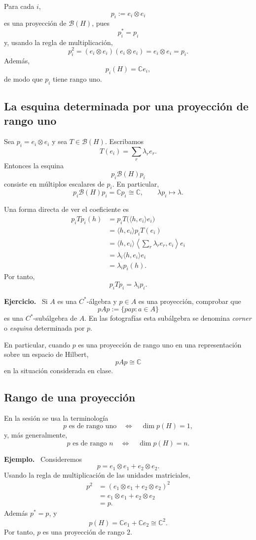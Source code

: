 \documentclass[11pt]{article}
\newcommand{\C}{\mathbb{C}}
\newcommand{\BH}{\mathcal{B}(H)}
\newenvironment{ejemplo}{\par\medskip\noindent\textbf{Ejemplo.}\ }{\par\medskip}
\newenvironment{ejercicio}{\par\medskip\noindent\textbf{Ejercicio.}\ }{\par\medskip}
\begin{document}
Para cada $i$,
\[
p_i:=e_i\otimes e_i
\]
es una proyección de $\BH$, pues
\[
p_i^*=p_i
\]
y, usando la regla de multiplicación,
\[
p_i^2=(e_i\otimes e_i)(e_i\otimes e_i)=e_i\otimes e_i=p_i.
\]
Además,
\[
p_i(H)=\C e_i,
\]
de modo que $p_i$ tiene rango uno.

\subsection{La esquina determinada por una proyección de rango uno}

Sea $p_i=e_i\otimes e_i$ y sea $T\in\BH$. Escribamos
\[
T(e_i)=\sum_r \lambda_r e_r.
\]
Entonces la esquina
\[
p_i\BH p_i
\]
consiste en múltiplos escalares de $p_i$. En particular,
\[
p_i\BH p_i=\C p_i\cong\C,
\qquad
\lambda p_i\longmapsto \lambda.
\]

Una forma directa de ver el coeficiente es
\begin{align*}
p_iTp_i(h)
 &=p_iT\bigl(\langle h,e_i\rangle e_i\bigr)\\
 &=\langle h,e_i\rangle p_iT(e_i)\\
 &=\langle h,e_i\rangle
   \left\langle \sum_r\lambda_r e_r,e_i\right\rangle e_i\\
 &=\lambda_i\langle h,e_i\rangle e_i\\
 &=\lambda_i p_i(h).
\end{align*}
Por tanto,
\[
p_iTp_i=\lambda_i p_i.
\]

\begin{ejercicio}
Si $A$ es una $C^*$-álgebra y $p\in A$ es una proyección, comprobar que
\[
pAp:=\{pap:a\in A\}
\]
es una $C^*$-subálgebra de $A$. En las fotografías esta subálgebra se denomina
\emph{corner} o \emph{esquina} determinada por $p$.
\end{ejercicio}

En particular, cuando $p$ es una proyección de rango uno en una representación
sobre un espacio de Hilbert,
\[
pAp\cong\C
\]
en la situación considerada en clase.

\subsection{Rango de una proyección}

En la sesión se usa la terminología
\[
p\text{ es de rango uno}
\quad\Longleftrightarrow\quad
\dim p(H)=1,
\]
y, más generalmente,
\[
p\text{ es de rango }n
\quad\Longleftrightarrow\quad
\dim p(H)=n.
\]

\begin{ejemplo}
Consideremos
\[
p=e_1\otimes e_1+e_2\otimes e_2.
\]
Usando la regla de multiplicación de las unidades matriciales,
\begin{align*}
p^2
 &= (e_1\otimes e_1+e_2\otimes e_2)^2\\
 &=e_1\otimes e_1+e_2\otimes e_2\\
 &=p.
\end{align*}
Además $p^*=p$, y
\[
p(H)=\C e_1+\C e_2\cong\C^2.
\]
Por tanto, $p$ es una proyección de rango $2$.
\end{ejemplo}
\end{document}
